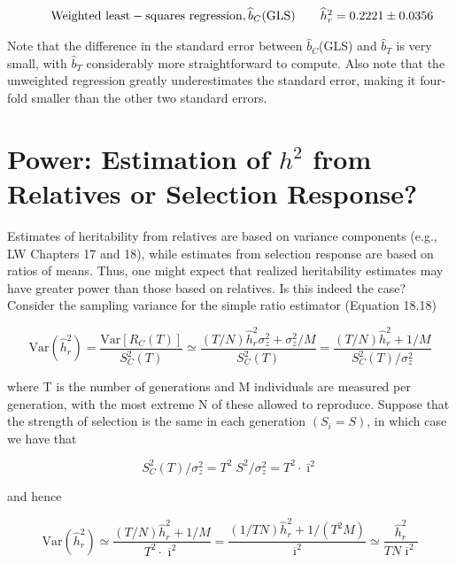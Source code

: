 \documentclass{article}
\begin{document}
\begin{equation}
\begin{array}{r l r l r l}&{}&{\mathrm{W e i g h t e d~l e a s t-s q u a r e s~r e g r e s s i o n},\widehat{b}_{C}(\mathrm{G L S})}&{}&{\widehat{h}_{r}^{2}=0.2221\pm0.0356}\end{array}
\end{equation}

Note that the difference in the standard error between  $ \widehat{b}_{C} $(GLS) and  $ \widehat{b}_{T} $ is very small, with  $ \widehat{b}_{T} $ considerably more straightforward to compute. Also note that the unweighted regression greatly underestimates the standard error, making it four-fold smaller than the other two standard errors.

\section{Power: Estimation of  $ h^{2} $ from Relatives or Selection Response?}
Estimates of heritability from relatives are based on variance components (e.g., LW Chapters 17 and 18), while estimates from selection response are based on ratios of means. Thus, one might expect that realized heritability estimates may have greater power than those based on relatives. Is this indeed the case? Consider the sampling variance for the simple ratio estimator (Equation 18.18)

\begin{equation}
\mathrm{Var}(\widehat{h}_{r}^{2})=\frac{\mathrm{Var}\left[R_{C}(T)\right]}{S_{C}^{2}(T)}\simeq\frac{(T/N)\widehat{h}_{r}^{2}\sigma_{z}^{2}+\sigma_{z}^{2}/M}{S_{C}^{2}(T)}=\frac{(T/N)\widehat{h}_{r}^{2}+1/M}{S_{C}^{2}(T)/\sigma_{z}^{2}}
\end{equation}

where T is the number of generations and M individuals are measured per generation, with the most extreme N of these allowed to reproduce. Suppose that the strength of selection is the same in each generation  $ (S_i = S) $, in which case we have that

\begin{equation}
S_{C}^{2}(T)/\sigma_{z}^{2}=T^{2}\;S^{2}/\sigma_{z}^{2}=T^{2}\cdot\bar{\imath}^{2}
\end{equation}

and hence

\begin{equation}
\mathrm{Var}(\widehat{h}_{r}^{2})\simeq\frac{(T/N)\widehat{h}_{r}^{2}+1/M}{T^{2}\cdot\overline{\imath}^{2}}=\frac{(1/TN)\widehat{h}_{r}^{2}+1/(T^{2}M)}{\overline{\imath}^{2}}\simeq\frac{\widehat{h}_{r}^{2}}{TN\overline{\imath}^{2}}
\tag{18.19}
\label{eq:18_19}
\end{equation}
\end{document}
